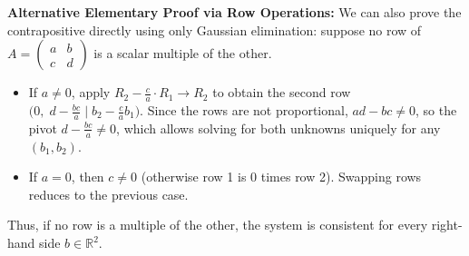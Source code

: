 \begin{exercisesolution}
\begin{ainote}
\textbf{Alternative Elementary Proof via Row Operations:}
We can also prove the contrapositive directly using only Gaussian elimination: suppose no row of $A = \left(\begin{smallmatrix} a & b \\ c & d \end{smallmatrix}\right)$ is a scalar multiple of the other.
\begin{itemize}
    \item If $a \ne 0$, apply $R_2 - \frac{c}{a} \cdot R_1 \to R_2$ to obtain the second row $\bigl(0, \; d - \frac{bc}{a} \;\big|\; b_2 - \frac{c}{a}b_1\bigr)$. Since the rows are not proportional, $ad - bc \ne 0$, so the pivot $d - \frac{bc}{a} \ne 0$, which allows solving for both unknowns uniquely for any $(b_1, b_2)$.
    \item If $a = 0$, then $c \ne 0$ (otherwise row 1 is $0$ times row 2). Swapping rows reduces to the previous case.
\end{itemize}
Thus, if no row is a multiple of the other, the system is consistent for every right-hand side $b \in \mathbb{R}^2$.
\end{ainote}
\end{exercisesolution}
